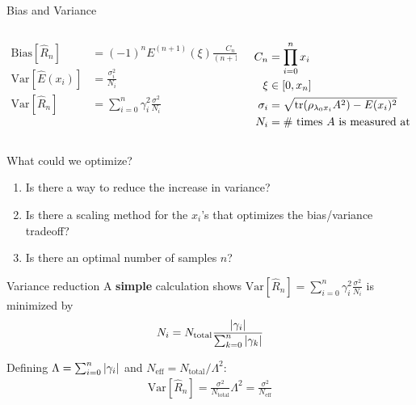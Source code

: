 \documentclass[11pt,aspectratio=1610,xcolor=dvipsnames]{beamer}
\begin{document}
\begin{frame}{Bias and Variance}

	\begin{columns}
		\begin{column}{0.7\textwidth}
			\begin{align*}
				\mathrm{Bias}[\hat{R}_n]   & = (-1)^n E^{(n+1)}(\xi)\frac{C_n}{(n+1)!}        \\
				\mathrm{Var}[\hat{E}(x_i)] & = \frac{\sigma_i^2}{N_i}                         \\
				\mathrm{Var}[\hat{R}_n]    & = \sum_{i = 0}^n \gamma_i^2 \frac{\sigma^2}{N_i}
			\end{align*}
		\end{column}
		\begin{column}{0.3\textwidth}
			\begin{align*}
				C_n      & = \prod_{i = 0}^n x_i                           \\
				\xi      & \in [0, x_n]                                    \\
				\sigma_i & = \sqrt{\tr(\rho_{\lambda_0x_i}A^2) - E(x_i)^2} \\
				N_i      & = \text{\# times $A$ is measured at $x_i$}
			\end{align*}
		\end{column}
	\end{columns}

\end{frame}

\begin{frame}{What could we optimize?}
	\begin{enumerate}
		\item Is there a way to reduce the increase in variance?
		\item Is there a scaling method for the $x_i$'s that optimizes the bias/variance tradeoff?
		\item Is there an optimal number of samples $n$?
	\end{enumerate}
\end{frame}

\begin{frame}{Variance reduction}
	A \textbf{simple} calculation shows $\mathrm{Var}[\hat{R}_n] = \sum_{i = 0}^n \gamma_i^2 \frac{\sigma^2}{N_i}$ is minimized by
	\begin{equation*}
		N_i = N_\text{total}\frac{\abs{\gamma_i}}{\sum_{k = 0}^n \abs{\gamma_k}}
	\end{equation*}

	Defining $\Lambda = \sum_{i = 0}^n \abs{\gamma_i}$ and $N_\text{eff} = N_\text{total} / \Lambda^2$:
	\begin{align*}
		\mathrm{Var}[\hat{R}_n] = \frac{\sigma^2}{N_\text{total}}\Lambda^2 = \frac{\sigma^2}{N_\text{eff}}
	\end{align*}
\end{frame}
\end{document}
